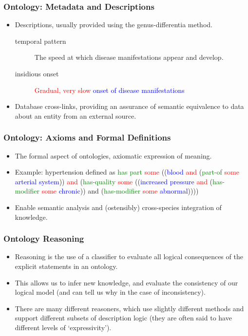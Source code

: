 \documentclass{beamer}
\begin{document}
\begin{frame}
\frametitle{Ontology: Metadata and Descriptions}

\begin{itemize}
  \item Descriptions, usually provided using the genus-differentia method.
  \begin{description}
    \item[temporal pattern] The speed at which disease
    manifestations appear and develop.
    \item[insidious onset] \textcolor{red}{Gradual, very slow}
    \textcolor{blue}{onset of disease manifestations}
  \end{description}
  \item Database cross-links, providing an assurance of semantic equivalence to
  data about an entity from an external source.
\end{itemize}
\end{frame}

\begin{frame}
\frametitle{Ontology: Axioms and Formal Definitions}

\begin{itemize}
  \item The formal aspect of ontologies, axiomatic expression of meaning.
  \item Example: hypertension defined as \textcolor{green}{has part}
  \textcolor{red}{some} ((\textcolor{blue}{blood} \textcolor{red}{and}
  (\textcolor{green}{part-of} \textcolor{red}{some} \textcolor{blue}{arterial
  system})) \textcolor{red}{and} (\textcolor{green}{has-quality}
  \textcolor{red}{some}
  ((\textcolor{blue}{increased pressure} \textcolor{red}{and}
  (\textcolor{green}{has-modifier} \textcolor{red}{some}
  \textcolor{blue}{chronic})) and (\textcolor{green}{has-modifier}
  \textcolor{red}{some}
  \textcolor{blue}{abnormal}))))
  \item Enable semantic analysis and (ostensibly) cross-species integration of
  knowledge.
\end{itemize}
\end{frame}

\begin{frame}
\frametitle{Ontology Reasoning}

\begin{itemize}
  \item Reasoning is the use of a classifier to evaluate all logical consequences
  of the explicit statements in an ontology.
  \item This allows us to infer new knowledge, and evaluate the consistency of our
  logical model (and can tell us why in the case of inconsistency).
  \item There are many different reasoners, which use slightly different methods
  and support different subsets of description logic (they are often said to have
  different levels of ‘expressivity’).
\end{itemize}
\end{frame}
\end{document}
